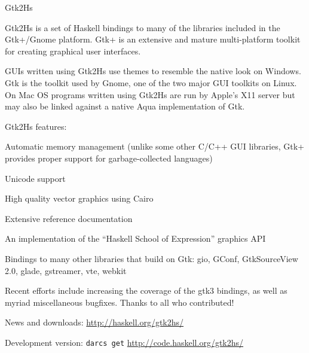 \begin{hcarentry}{Gtk2Hs}
\label{gtk2hs}
\makeheader

Gtk2Hs is a set of Haskell bindings to many of the libraries included
in the Gtk+/Gnome platform. Gtk+ is an extensive and mature
multi-platform toolkit for creating graphical user interfaces.

GUIs written using Gtk2Hs use themes to resemble the native look on
Windows. Gtk is the toolkit used by Gnome, one of the two major GUI toolkits
on Linux. On Mac OS programs written using Gtk2Hs are run by Apple's
X11 server but may also be linked against a native Aqua implementation
of Gtk.

\Separate
Gtk2Hs features:
\begin{compactitem}
\item Automatic memory management (unlike some other C/C++ GUI
libraries, Gtk+ provides proper support for garbage-collected languages)
\item Unicode support
\item High quality vector graphics using Cairo
\item Extensive reference documentation
\item An implementation of the ``Haskell School of Expression'' graphics
API
\item Bindings to many other libraries that build on Gtk: gio, GConf,
  GtkSourceView 2.0, glade, gstreamer, vte, webkit
\end{compactitem}

\Separate

Recent efforts include increasing the coverage of the gtk3 bindings, as well
as myriad miscellaneous bugfixes. Thanks to all who contributed!

\FurtherReading
\begin{compactitem}
\item News and downloads:
  \url{http://haskell.org/gtk2hs/}

\item Development version:
  \texttt{darcs get} \url{http://code.haskell.org/gtk2hs/}
\end{compactitem}
\end{hcarentry} 
